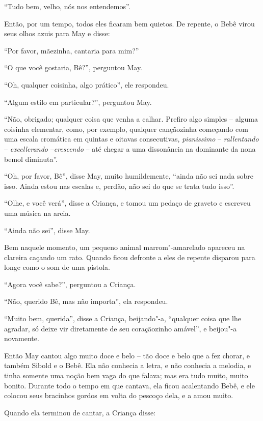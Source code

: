 ``Tudo bem, velho, nós nos entendemos''.

Então, por um tempo, todos eles ficaram bem quietos. De repente, o Bebê
virou seus olhos azuis para May e disse:

``Por favor, mãezinha, cantaria para mim?''

``O que você gostaria, Bê?'', perguntou May.

``Oh, qualquer coisinha, algo prático'', ele respondeu.

``Algum estilo em particular?'', perguntou May.

``Não, obrigado; qualquer coisa que venha a calhar. Prefiro algo simples
-- alguma coisinha elementar, como, por exemplo, qualquer cançãozinha
começando com uma escala cromática em quintas e oitavas consecutivas,
\emph{pianissimo} -- \emph{rallentando} -- \emph{excellerando}
--\emph{crescendo} -- até chegar a uma dissonância na dominante da nona
bemol diminuta''.

``Oh, por favor, Bê'', disse May, muito humildemente, ``ainda não sei
nada sobre isso. Ainda estou nas escalas e, perdão, não sei do que se
trata tudo isso''.

``Olhe, e você verá'', disse a Criança, e tomou um pedaço de graveto e
escreveu uma música na areia.


``Ainda não sei'', disse May.

Bem naquele momento, um pequeno animal marrom"-amarelado apareceu na
clareira caçando um rato. Quando ficou defronte a eles de repente
disparou para longe como o som de uma pistola.

``Agora você sabe?'', perguntou a Criança.

``Não, querido Bê, mas não importa'', ela respondeu.

``Muito bem, querida'', disse a Criança, beijando"-a, ``qualquer coisa
que lhe agradar, só deixe vir diretamente de seu coraçãozinho amável'',
e beijou"-a novamente.

Então May cantou algo muito doce e belo -- tão doce e belo que a fez
chorar, e também Sibold e o Bebê. Ela não conhecia a letra, e não
conhecia a melodia, e tinha somente uma noção bem vaga do que falava;
mas era tudo muito, muito bonito. Durante todo o tempo em que cantava,
ela ficou acalentando Bebê, e ele colocou seus bracinhos gordos em volta
do pescoço dela, e a amou muito.

Quando ela terminou de cantar, a Criança disse:

